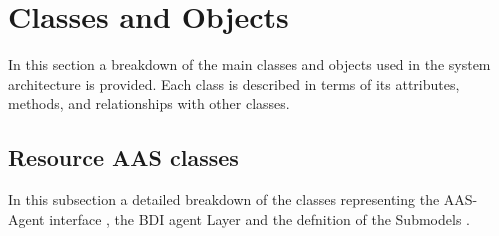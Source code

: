 \section{Classes and Objects}

In this section a breakdown of the main classes and objects used in the system architecture is provided. Each class is described in terms of its attributes, methods, and relationships with other classes.

\subsection{Resource AAS classes}
In this subsection a detailed breakdown of the classes representing the AAS-Agent interface , the BDI agent Layer and the defnition of the Submodels .

\newpage
